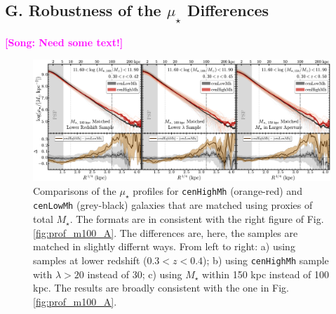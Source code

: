 \documentclass{emulateapj}
\def\rbcg{\texttt{cenHighMh}}
\def\nbcg{\texttt{cenLowMh}}
\def\mstar{{$M_{\star}$}}
\def\mden{{$\mu_{\star}$}}
\newcommand{\song}[1]{\textcolor{magenta}{\textbf{[Song: #1]}}}
\begin{document}
\begin{CJK*}{UTF8}{gbsn}
    
\section{G. Robustness of the \mden{} Differences} 
	\label{app:robust}
    
    \song{Need some text!}
 
  \begin{figure}[t!]
      \centering 
      \includegraphics[width=\textwidth]{fig/redbcg_prof_3}
      \caption{Comparisons of the \mden{} profiles for \rbcg{} (orange-red) and \nbcg{} 
      	(grey-black) galaxies that are matched using proxies of total \mstar{}. 
        The formats are in consistent with the right figure of Fig.\ref{fig:prof_m100_A}.
        The differences are, here, the samples are matched in slightly differnt ways. 
        From left to right: a) using samples at lower redshift ($0.3 < z < 0.4$); 
        b) using \rbcg{} sample with $\lambda > 20$ instead of 30; 
        c) using \mstar{} within 150 kpc instead of 100 kpc.
        The results are broadly consistent with the one in Fig.\ref{fig:prof_m100_A}.}
      \label{fig:prof_m100_B}
  \end{figure}


\end{CJK*}
\end{document}
